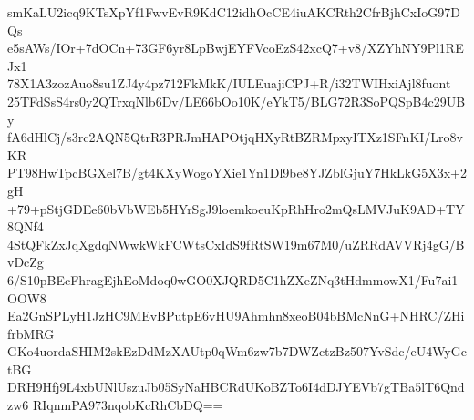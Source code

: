 smKaLU2icq9KTsXpYf1FwvEvR9KdC12idhOcCE4iuAKCRth2CfrBjhCxIoG97DQs
e5sAWs/IOr+7dOCn+73GF6yr8LpBwjEYFVcoEzS42xcQ7+v8/XZYhNY9Pl1REJx1
78X1A3zozAuo8su1ZJ4y4pz712FkMkK/IULEuajiCPJ+R/i32TWIHxiAjl8fuont
25TFdSsS4rs0y2QTrxqNlb6Dv/LE66bOo10K/eYkT5/BLG72R3SoPQSpB4c29UBy
fA6dHlCj/s3rc2AQN5QtrR3PRJmHAPOtjqHXyRtBZRMpxyITXz1SFnKI/Lro8vKR
PT98HwTpcBGXel7B/gt4KXyWogoYXie1Yn1Dl9be8YJZblGjuY7HkLkG5X3x+2gH
+79+pStjGDEe60bVbWEb5HYrSgJ9loemkoeuKpRhHro2mQsLMVJuK9AD+TY8QNf4
4StQFkZxJqXgdqNWwkWkFCWtsCxIdS9fRtSW19m67M0/uZRRdAVVRj4gG/BvDcZg
6/S10pBEcFhragEjhEoMdoq0wGO0XJQRD5C1hZXeZNq3tHdmmowX1/Fu7ai1OOW8
Ea2GnSPLyH1JzHC9MEvBPutpE6vHU9Ahmhn8xeoB04bBMcNnG+NHRC/ZHifrbMRG
GKo4uordaSHIM2skEzDdMzXAUtp0qWm6zw7b7DWZctzBz507YvSdc/eU4WyGctBG
DRH9Hfj9L4xbUNlUszuJb05SyNaHBCRdUKoBZTo6I4dDJYEVb7gTBa5lT6Qndzw6
RIqnmPA973nqobKcRhCbDQ==
